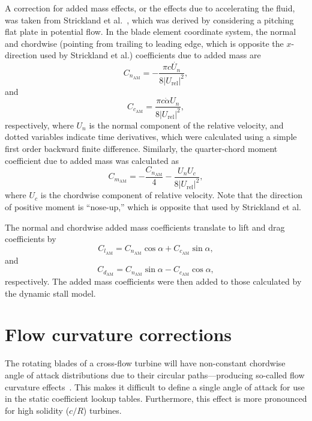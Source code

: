 \documentclass[times]{weauth}
\begin{document}
A correction for added mass effects, or the effects due to accelerating the
fluid, was taken from Strickland et al.~\cite{Strickland1981}, which was derived
by considering a pitching flat plate in potential flow. In the blade element
coordinate system, the normal and chordwise (pointing from trailing to leading
edge, which is opposite the $x$-direction used by Strickland et al.)
coefficients due to added mass are
\begin{equation}
    C_{n_\mathrm{AM}} = -\frac{\pi c \dot{U_n}}{8 | U_\mathrm{rel} |^2},
\end{equation}
and
\begin{equation}
    C_{c_\mathrm{AM}} = \frac{\pi c \dot{\alpha} U_n }{8 | U_\mathrm{rel} |^2},
\end{equation}
respectively, where $U_n$ is the normal component of the relative velocity, and
dotted variables indicate time derivatives, which were calculated using a simple
first order backward finite difference. Similarly, the quarter-chord moment
coefficient due to added mass was calculated as
\begin{equation}
    C_{m_\mathrm{AM}} = -\frac{C_{n_\mathrm{AM}}}{4}
        - \frac{U_n U_c}{8 | U_\mathrm{rel} |^2},
\end{equation}
where $U_c$ is the chordwise component of relative velocity. Note that the
direction of positive moment is ``nose-up,'' which is opposite that used by
Strickland et al.

The normal and chordwise added mass coefficients translate to lift and drag
coefficients by
\begin{equation}
    C_{l_\mathrm{AM}} = C_{n_\mathrm{AM}} \cos \alpha + C_{c_\mathrm{AM}} \sin
    \alpha,
\end{equation}
and
\begin{equation}
    C_{d_\mathrm{AM}} = C_{n_\mathrm{AM}} \sin \alpha - C_{c_\mathrm{AM}} \cos
    \alpha,
\end{equation}
respectively. The added mass coefficients were then added to those calculated by
the dynamic stall model.


\section{Flow curvature corrections}

The rotating blades of a cross-flow turbine will have non-constant chordwise
angle of attack distributions due to their circular paths---producing so-called
flow curvature effects~\cite{Migliore1980}. This makes it difficult to define a
single angle of attack for use in the static coefficient lookup tables.
Furthermore, this effect is more pronounced for high solidity ($c/R$) turbines.
\end{document}
